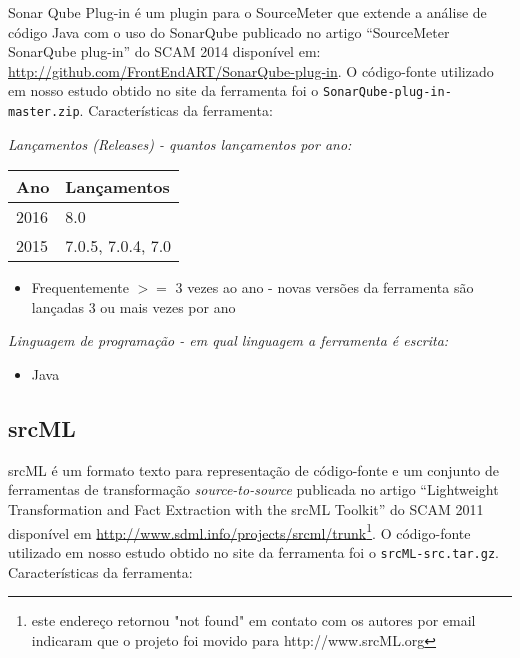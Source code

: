 Sonar Qube Plug-in é um plugin para o SourceMeter que extende a análise de
código Java com o uso do SonarQube publicado no artigo ``SourceMeter SonarQube
plug-in'' do SCAM 2014 disponível em:
\url{http://github.com/FrontEndART/SonarQube-plug-in}. O código-fonte
utilizado em nosso estudo obtido no site da ferramenta foi o
\texttt{SonarQube-plug-in-master.zip}. Características da ferramenta:

\begin{description}

  \item {\it Lançamentos ({\it Releases}) - quantos lançamentos por ano:}
    \begin{table}[h!]
      \centering
      \begin{tabular}{| l | l |}
        \hline
        Ano  & Lançamentos       \\
        \hline
        2016 & 8.0               \\
        2015 & 7.0.5, 7.0.4, 7.0 \\
        \hline
      \end{tabular}
    \end{table}
    \begin{itemize}
      \item Frequentemente $>=$ 3 vezes ao ano - novas versões da ferramenta são lançadas 3 ou mais vezes por ano
    \end{itemize}

  \item {\it Linguagem de programação - em qual linguagem a ferramenta é escrita:}
    \begin{itemize}
      \item Java
    \end{itemize}

\end{description}

\subsection{srcML}

srcML é um formato texto para representação de código-fonte e um conjunto de
ferramentas de transformação {\it source-to-source} publicada no artigo
``Lightweight Transformation and Fact Extraction with the srcML Toolkit'' do
SCAM 2011 disponível em
\url{http://www.sdml.info/projects/srcml/trunk}\footnote{este endereço
retornou "not found" em contato com os autores por email indicaram que o
projeto foi movido para http://www.srcML.org}. O código-fonte utilizado em
nosso estudo obtido no site da ferramenta foi o \texttt{srcML-src.tar.gz}.
Características da ferramenta:


